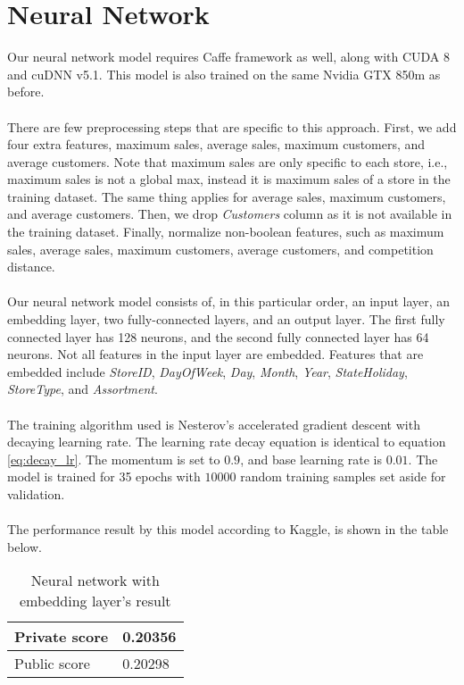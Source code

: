 \section{Neural Network}
Our neural network model requires Caffe framework as well, along with CUDA 8 and cuDNN v5.1. This model is also trained on the same Nvidia GTX 850m as before. \\ \\
There are few preprocessing steps that are specific to this approach. First, we add four extra features, maximum sales, average sales, maximum customers, and average customers. Note that maximum sales are only specific to each store, i.e., maximum sales is not a global max, instead it is maximum sales of a store in the training dataset. The same thing applies for average sales, maximum customers, and average customers. Then, we drop \textit{Customers} column as it is not available in the training dataset. Finally, normalize non-boolean features, such as maximum sales, average sales, maximum customers, average customers, and competition distance. \\ \\
Our neural network model consists of, in this particular order, an input layer, an embedding layer, two fully-connected layers, and an output layer. The first fully connected layer has 128 neurons, and the second fully connected layer has 64 neurons. Not all features in the input layer are embedded. Features that are embedded include \textit{StoreID}, \textit{DayOfWeek}, \textit{Day}, \textit{Month}, \textit{Year}, \textit{StateHoliday}, \textit{StoreType}, and \textit{Assortment}. \\ \\
The training algorithm used is Nesterov's accelerated gradient descent with decaying learning rate. The learning rate decay equation is identical to equation \ref{eq:decay_lr}. The momentum is set to $0.9$, and base learning rate is $0.01$. The model is trained for 35 epochs with $10000$ random training samples set aside for validation. \\ \\
The performance result by this model according to Kaggle, is shown in the table below.
\begin{table}[h]
	\centering
	\caption{Neural network with embedding layer's result}
	\label{tab:nn_result}
	\begin{tabular}{|m{100pt}|m{50pt}|}
		\hline
		Private score & 0.20356 \\ \hline
		Public score  & 0.20298 \\ \hline
	\end{tabular}
\end{table}
